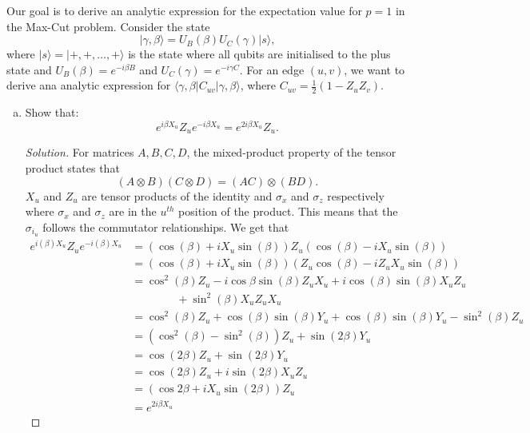 \documentclass[11pt]{article}
\newenvironment{question}[2][Question]{\begin{trivlist}
\item[\hskip \labelsep {\bfseries #1}\hskip \labelsep {\bfseries #2.}]}{\end{trivlist}}
\newenvironment{solution}{\begin{proof}[Solution]}{\end{proof}}
\newcommand{\lr}[3]{\!\left#1 #3 \right#2}
\begin{document}
    \begin{question}{2}
        Our goal is to derive an analytic expression for the expectation value for $p=1$ in the Max-Cut problem. Consider the state
        $$|\gamma,\beta\rangle = U_B(\beta)U_C(\gamma)|s\rangle,$$
        where $|s\rangle=|+,+,\dots,+\rangle$ is the state where all qubits are initialised to the plus state and $U_B(\beta)=e^{-i\beta B}$ and $U_C(\gamma)=e^{-i\gamma C}$. For an edge $(u,v)$, we want to derive ana analytic expression for $\langle\gamma,\beta|C_{uv}|\gamma,\beta\rangle$, where $C_{uv}=\frac{1}{2}(1-Z_uZ_v)$.
        \begin{enumerate}[(a)]
            \item 
            Show that:
            $$e^{i\beta X_u}Z_ue^{-i\beta X_u}=e^{2i\beta X_u}Z_u.$$
            \begin{solution}
                For matrices $A,B,C,D$, the mixed-product property of the tensor product states that
                $$(A\otimes B)(C\otimes D) = (AC)\otimes(BD).$$
                $X_u$ and $Z_u$ are tensor products of the identity and $\sigma_x$ and $\sigma_z$ respectively where $\sigma_x$ and $\sigma_z$ are in the $u^{th}$ position of the product. This means that the $\sigma_{i_u}$ follows the commutator relationships. We get that
                \begin{align*}
                    e^{i(\beta) X_u}Z_ue^{-i(\beta) X_u} &= \lr(){\cos(\beta)+iX_u\sin(\beta)}Z_u\lr(){\cos(\beta)-iX_u\sin(\beta)} \\
                    &= \lr(){\cos(\beta)+iX_u\sin(\beta)}\lr(){Z_u\cos(\beta)-iZ_uX_u\sin(\beta)} \\
                    &= \cos^2(\beta) Z_u-i\cos\beta\sin(\beta) Z_uX_u + i\cos(\beta)\sin(\beta) X_uZ_u  \\
                    &\quad \quad \quad \quad + \sin^2(\beta) X_uZ_uX_u \\
                    &= \cos^2(\beta) Z_u +\cos(\beta)\sin(\beta) Y_u + \cos(\beta)\sin(\beta) Y_u-\sin^2(\beta) Z_u \\
                    &= \lr(){\cos^2(\beta) -\sin^2(\beta)} Z_u + \sin(2\beta) Y_u \\
                    &= \cos(2\beta)Z_u+\sin(2\beta)Y_u \\
                    &= \cos(2\beta)Z_u +i\sin(2\beta)X_uZ_u \\
                    &= \lr(){\cos{2\beta}+iX_u\sin(2\beta)}Z_u \\
                    &= e^{2i\beta X_u}
                \end{align*}
            \end{solution}


\end{enumerate}
\end{question}
\end{document}
